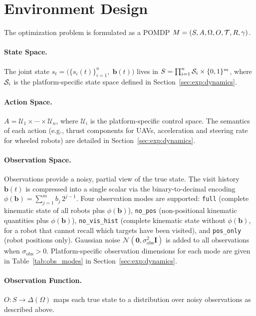 \documentclass{article}
\begin{document}
\section{Environment Design}
\label{sec:mdp}

The optimization problem is formulated as a POMDP $M = (S, A, \Omega, O, \mathcal{T}, R, \gamma)$.

\paragraph{State Space.}
The joint state $s_t = \big(\{s_i(t)\}_{i=1}^n,\; \mathbf{b}(t)\big)$ lives in $S = \prod_{i=1}^n \mathcal{S}_i \times \{0,1\}^m$, where $\mathcal{S}_i$ is the platform-specific state space defined in Section~\ref{sec:exp:dynamics}.

\paragraph{Action Space.}
$A = \mathcal{U}_1 \times \cdots \times \mathcal{U}_n$, where $\mathcal{U}_i$ is the platform-specific control space. The semantics of each action (e.g., thrust components for UAVs, acceleration and steering rate for wheeled robots) are detailed in Section~\ref{sec:exp:dynamics}.

\paragraph{Observation Space.}
Observations provide a noisy, partial view of the true state. The visit history $\mathbf{b}(t)$ is compressed into a single scalar via the binary-to-decimal encoding $\phi(\mathbf{b}) = \sum_{j=1}^m b_j\,2^{j-1}$. Four observation modes are supported: \texttt{full} (complete kinematic state of all robots plus $\phi(\mathbf{b})$), \texttt{no\_pos} (non-positional kinematic quantities plus $\phi(\mathbf{b})$), \texttt{no\_vis\_hist} (complete kinematic state without $\phi(\mathbf{b})$, for a robot that cannot recall which targets have been visited), and \texttt{pos\_only} (robot positions only). Gaussian noise $\mathcal{N}(\mathbf{0}, \sigma_\mathrm{obs}^2 \mathbf{I})$ is added to all observations when $\sigma_\mathrm{obs} > 0$. Platform-specific observation dimensions for each mode are given in Table~\ref{tab:obs_modes} in Section~\ref{sec:exp:dynamics}.

\paragraph{Observation Function.}
$O : S \to \Delta(\Omega)$ maps each true state to a distribution over noisy observations as described above.
\end{document}

